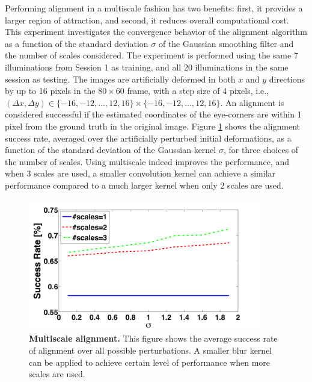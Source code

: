 Performing alignment in a multiscale fashion has two benefits: first, it
provides a larger region of attraction, and second, it reduces overall
computational cost. This experiment investigates the convergence behavior of
the alignment algorithm as a function of the standard deviation $\sigma$ of the
Gaussian smoothing filter and the number of scales considered.
The experiment is performed using the same 7 illuminations from
Session 1 as training, and all 20 illuminations in the same
session as testing. The images are artificially deformed in
both $x$ and $y$ directions by up to 16 pixels in the
$80\times 60$ frame, with a step size of 4 pixels, i.e.,
$(\Delta x, \Delta y) \in \{-16,-12,\ldots,12,16\} \times
\{-16,-12,\ldots,12,16\}$. An alignment is considered
successful if the estimated coordinates of the eye-corners
are within 1 pixel from the ground truth in the original
image.  Figure \ref{fig:multiscale} shows the
alignment success rate, averaged over the artificially
perturbed initial deformations, as a function of the
standard deviation of the Gaussian kernel $\sigma$, for
three choices of the number of scales. 
Using multiscale indeed improves the performance, and when
3 scales are used, a smaller convolution kernel can achieve
a similar performance compared to a much larger kernel when
only 2 scales are used.
\begin{figure}
\centering
\includegraphics[width=4in]{figures_pami/multiscale.png}
\caption{\small{\bf Multiscale alignment.} This figure shows the average success rate of alignment over all possible perturbations. A smaller blur kernel can be applied to achieve certain level of performance when more scales are used.}
\label{fig:multiscale}
\end{figure}

